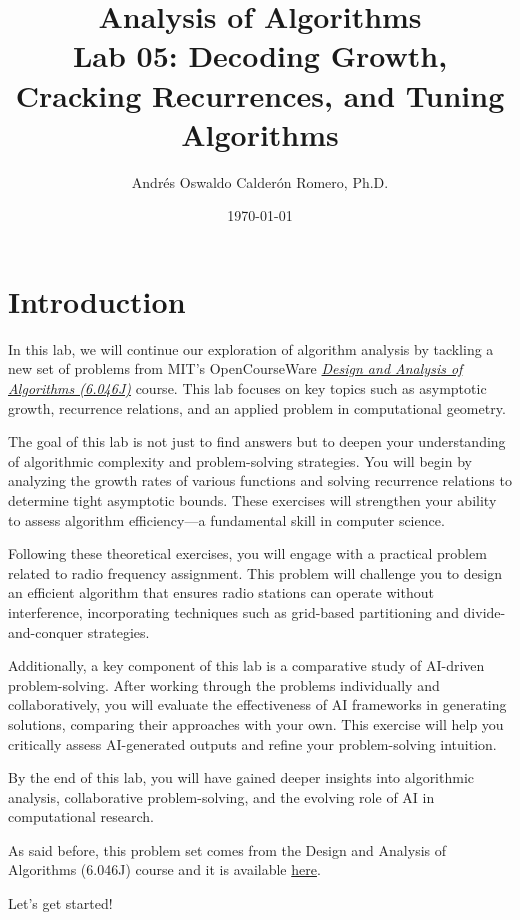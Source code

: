 \documentclass[12pt]{article}
\title{Analysis of Algorithms \\ Lab 05: Decoding Growth, Cracking Recurrences, and Tuning Algorithms}
\author{Andrés Oswaldo Calderón Romero, Ph.D.}
\date{\today}
\begin{document}
\maketitle

\section{Introduction}
In this lab, we will continue our exploration of algorithm analysis by tackling a new set of problems from MIT's OpenCourseWare \href{https://ocw.mit.edu/courses/6-046j-design-and-analysis-of-algorithms-spring-2015/}{\textit{Design and Analysis of Algorithms (6.046J)}} course. This lab focuses on key topics such as asymptotic growth, recurrence relations, and an applied problem in computational geometry.

The goal of this lab is not just to find answers but to deepen your understanding of algorithmic complexity and problem-solving strategies. You will begin by analyzing the growth rates of various functions and solving recurrence relations to determine tight asymptotic bounds. These exercises will strengthen your ability to assess algorithm efficiency—a fundamental skill in computer science.

Following these theoretical exercises, you will engage with a practical problem related to radio frequency assignment. This problem will challenge you to design an efficient algorithm that ensures radio stations can operate without interference, incorporating techniques such as grid-based partitioning and divide-and-conquer strategies.

Additionally, a key component of this lab is a comparative study of AI-driven problem-solving. After working through the problems individually and collaboratively, you will evaluate the effectiveness of AI frameworks in generating solutions, comparing their approaches with your own. This exercise will help you critically assess AI-generated outputs and refine your problem-solving intuition.

By the end of this lab, you will have gained deeper insights into algorithmic analysis, collaborative problem-solving, and the evolving role of AI in computational research.

As said before, this problem set comes from the Design and Analysis of Algorithms (6.046J) course and it is available \href{https://ocw.mit.edu/courses/6-046j-design-and-analysis-of-algorithms-spring-2015/resources/problem-set-1/}{here}.

Let's get started!
\end{document}
